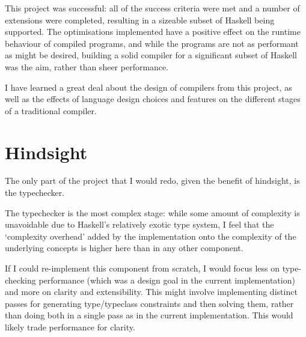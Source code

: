 \documentclass[dissertation.tex]{subfiles}
\begin{document}
This project was successful: all of the success criteria were met and a number of extensions were completed, resulting in a sizeable subset of Haskell being supported. The optimisations implemented have a positive effect on the runtime behaviour of compiled programs, and while the programs are not as performant as might be desired, building a solid compiler for a significant subset of Haskell was the aim, rather than sheer performance.

I have learned a great deal about the design of compilers from this project, as well as the effects of language design choices and features on the different stages of a traditional compiler.

\section{Hindsight}
{
    The only part of the project that I would redo, given the benefit of hindsight, is the typechecker.

    The typechecker is the most complex stage: while some amount of complexity is unavoidable due to Haskell's relatively exotic type system, I feel that the `complexity overhead' added by the implementation onto the complexity of the underlying concepts is higher here than in any other component.

    If I could re-implement this component from scratch, I would focus less on type-checking performance (which was a design goal in the current implementation) and more on clarity and extensibility. This might involve implementing distinct passes for generating type/typeclass constraints and then solving them, rather than doing both in a single pass as in the current implementation. This would likely trade performance for clarity. 
}
\end{document}

